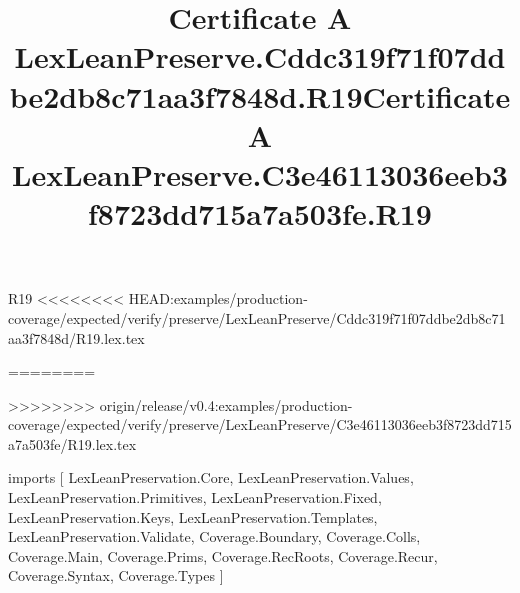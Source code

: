 \begin{lexlean}{R19}
<<<<<<<< HEAD:examples/production-coverage/expected/verify/preserve/LexLeanPreserve/Cddc319f71f07ddbe2db8c71aa3f7848d/R19.lex.tex
\title{Certificate A LexLeanPreserve.Cddc319f71f07ddbe2db8c71aa3f7848d.R19}
========
\title{Certificate A LexLeanPreserve.C3e46113036eeb3f8723dd715a7a503fe.R19}
>>>>>>>> origin/release/v0.4:examples/production-coverage/expected/verify/preserve/LexLeanPreserve/C3e46113036eeb3f8723dd715a7a503fe/R19.lex.tex
\begin{coremodule}
imports [
  LexLeanPreservation.Core,
  LexLeanPreservation.Values,
  LexLeanPreservation.Primitives,
  LexLeanPreservation.Fixed,
  LexLeanPreservation.Keys,
  LexLeanPreservation.Templates,
  LexLeanPreservation.Validate,
  Coverage.Boundary,
  Coverage.Colls,
  Coverage.Main,
  Coverage.Prims,
  Coverage.RecRoots,
  Coverage.Recur,
  Coverage.Syntax,
  Coverage.Types
]


\end{coremodule}
\end{lexlean}

